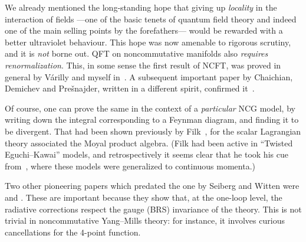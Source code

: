 \documentclass[a4paper,12pt]{article}
\newcommand{\1}{\mathbf{1}}         %
\newcommand{\7}{\dagger}            %
\newcommand{\8}{\bullet}            %
\renewcommand{\.}{\cdot}            %
\renewcommand{\:}{\colon}           %
\begin{document}
We already mentioned the long-standing hope that giving up
\textit{locality} in the interaction of fields ---one of the basic
tenets of quantum field theory and indeed one of the main selling
points by the forefathers--- would be rewarded with a better
ultraviolet behaviour. This hope was now amenable to rigorous
scrutiny, and it is {\it not\/} borne out. QFT on noncommutative
manifolds also \textit{requires renormalization}. This, in some sense
the first result of NCFT, was proved in general by V\'arilly and
myself in~\cite{Atlas}. A subsequent important paper by Chaichian,
Demichev and Pre\v{s}najder, written in a different spirit, confirmed
it~\cite{ChaichianDP}.

Of course, one can prove the same in the context of a
\textit{particular} NCG model, by writing down the integral
corresponding to a Feynman diagram, and finding it to be divergent.
That had been shown previously by Filk~\cite{Filk}, for the scalar
Lagrangian theory associated the Moyal product algebra. (Filk had been
active in ``Twisted Eguchi--Kawai'' models, and retrospectively it
seems clear that he took his cue from~\cite{GonzalezAKA}, where these
models were generalized to continuous momenta.)

Two other pioneering papers which predated the one by Seiberg and
Witten were \cite{MartinSRone} and \cite{KrajewskiW}. These are important
because they show that, at the one-loop level, the radiative
corrections respect the gauge (BRS) invariance of the theory. This is
not trivial in noncommutative Yang--Mills theory: for instance, it
involves curious cancellations for the 4-point function.
\end{document}
